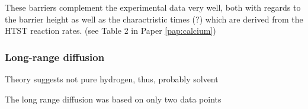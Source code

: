 These barriers complement the experimental data very well, both with regards to the barrier height as well as the charactristic times (?) which are derived from the HTST reaction rates. (see Table 2 in Paper \ref{pap:calcium})

\subsubsection{Long-range diffusion \pending}

\bit
\item Theory suggests not pure hydrogen, thus, probably solvent
\eit

The long range diffusion was based on only two data points

\incomplete

